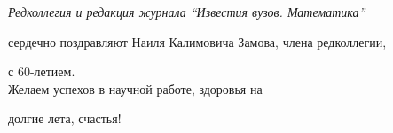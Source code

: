 


\newcommand{\tl}[3]{\medskip\noindent{\bf#1}\ #2 \dotfill #3 \par} 

\pagestyle{empty}





\phantom{a}

\bigskip



\bigskip



\bigskip



\bigskip



\bigskip



\vspace{5cm}



\begin{center}



{\it Редколлегия и редакция журнала ``Известия вузов. Математика''

сердечно поздравляют Наиля Калимовича Замова, члена редколлегии,

с 60-летием.\\ Желаем успехов в научной работе, здоровья на

долгие лета, счастья!}



\end{center}





